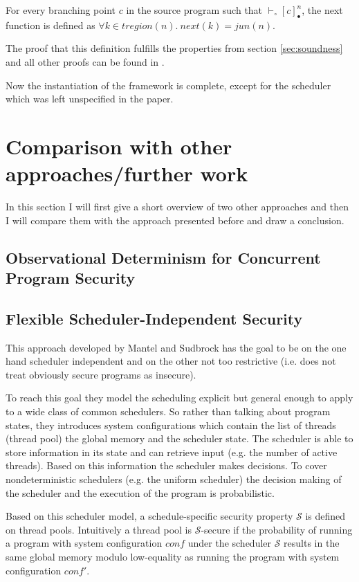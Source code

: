 \documentclass[a4paper,10pt]{llncs}
\begin{document}
\begin{definition}
For every branching point $c$ in the source program such that $\vdash_\circ [c]_\bullet^n$, the next function
is defined as $\forall k \in tregion(n) .\ next(k) = jun(n)$.
\end{definition}

The proof that this definition fulfills the properties from section \ref{sec:soundness} and all other
proofs can be found in \cite{Barthe09}.

Now the instantiation of the framework is complete, except for the scheduler which was left unspecified
in the paper.

\section{Comparison with other approaches/further work}
\label{sec:furtherwork}
In this section I will first give a short overview of two other approaches and then
I will compare them with the approach presented before and draw a conclusion.

\subsection{Observational Determinism for Concurrent Program Security\cite{Zdancewic03}}
\subsection{Flexible Scheduler-Independent Security\cite{Mantel10}}
This approach developed by Mantel and Sudbrock has the goal to be on the one hand
scheduler independent and on the other not too restrictive (i.e. does not treat
obviously secure programs as insecure).

To reach this goal they model the scheduling explicit but general enough to apply
to a wide class of common schedulers. So rather than talking about program states,
they introduces system configurations which contain the list of threads (thread pool) the global
memory and the scheduler state. The scheduler is able to store information in its
state and can retrieve input (e.g. the number of active threads). Based on this
information the scheduler makes decisions. To cover nondeterministic schedulers
(e.g. the uniform scheduler) the decision making of the scheduler and the execution
of the program is probabilistic.

Based on this scheduler model, a schedule-specific security property $\mathcal{S}$ is
defined on thread pools. Intuitively a thread pool is $\mathcal{S}$-secure if the
probability of running a program with system configuration $conf$ under the scheduler $\mathcal{S}$
results in the same global memory modulo low-equality as running the program with
system configuration $conf'$.
\end{document}
